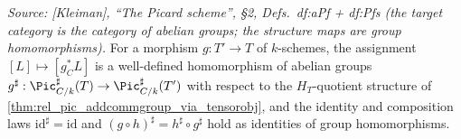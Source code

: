 \begin{lemma}
  \label{lem:rel_pic_sharp_functorial}

  \textit{Source: [Kleiman], ``The Picard scheme'', \S 2,
  Defs.~df:aPf + df:Pfs (the target category is the category of abelian
  groups; the structure maps are group homomorphisms).}
  For a morphism \(g : T' \to T\) of \(k\)-schemes, the assignment
  \([L] \mapsto [g_C^* L]\) is a well-defined homomorphism of abelian groups
  \(g^\sharp : \Pic^\sharp_{C/k}(T) \to \Pic^\sharp_{C/k}(T')\) with respect
  to the \(H_T\)-quotient structure of
  \cref{thm:rel_pic_addcommgroup_via_tensorobj}, and the identity and
  composition laws \(\mathrm{id}^\sharp = \mathrm{id}\) and
  \((g \circ h)^\sharp = h^\sharp \circ g^\sharp\) hold as identities of group
  homomorphisms.
\end{lemma}

